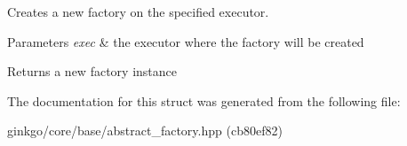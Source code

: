 Creates a new factory on the specified executor. 


\begin{DoxyParams}{Parameters}
{\em exec} & the executor where the factory will be created\\
\hline
\end{DoxyParams}
\begin{DoxyReturn}{Returns}
a new factory instance 
\end{DoxyReturn}


The documentation for this struct was generated from the following file\+:\begin{DoxyCompactItemize}
\item 
ginkgo/core/base/abstract\+\_\+factory.\+hpp (cb80ef82)\end{DoxyCompactItemize}
